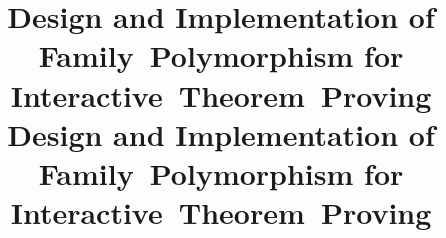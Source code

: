 \def\thetitle{%
Design and Implementation of \mbox{Family Polymorphism} for \mbox{Interactive Theorem Proving}
}

\ifreport
\title{\thetitle}
\else
\title{\thetitle}
\fi


\newcommand{\TT}{\mbox{\textls[-20]{FMLTT}}\xspace}
\newcommand{\Lang}{\mbox{\scshape\textls[-10]{fpop}}\xspace}
